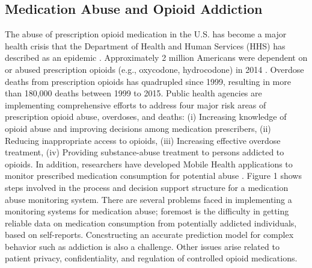 \documentclass[sigconf]{acmart}
\begin{document}
\subsection{Medication Abuse and Opioid Addiction} 

The abuse of prescription opioid medication in the U.S. has become a major health 
crisis that the Department of Health and Human Services (HHS) has described as an 
epidemic \cite{volkow14}. Approximately 2 million Americans were dependent on 
or abused prescription opioids (e.g., oxycodone, hydrocodone) in 2014 \cite{cdc17}. 
Overdose deaths from prescription opioids has quadrupled since 1999, resulting in 
more than 180,000 deaths between 1999 to 2015. Public health agencies are 
implementing comprehensive efforts to address four major risk areas of
prescription opioid abuse, overdoses, and deaths: (i) Increasing knowledge of 
opioid abuse and improving decisions among medication prescribers, (ii) Reducing 
inappropriate access to opioids, (iii) Increasing effective overdose treatment, 
(iv) Providing substance-abuse treatment to persons addicted to opioids.
In addition, researchers have developed Mobile Health applications to monitor
prescribed medication consumption for potential abuse \cite{Varshney14}.
Figure 1 shows steps involved in the process and decision support structure for
a medication abuse monitoring system. There are several problems faced in 
implementing a monitoring systems for medication abuse; foremost is the 
difficulty in getting reliable data on medication consumption from potentially 
addicted individuals, based on self-reports. Concstructing an accurate 
prediction model for complex behavior such as addiction is also a challenge. 
Other issues arise related to patient privacy, confidentiality, and regulation 
of controlled opioid medications. 
\end{document}
